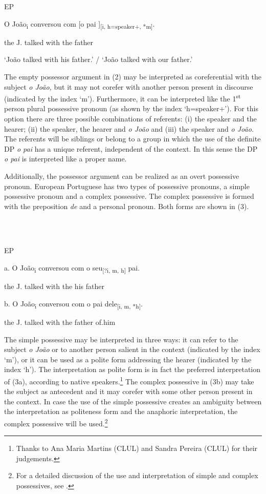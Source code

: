 \documentclass[output=paper]{langsci/langscibook}
\begin{document}
          EP

O  João\textsubscript{i}   conversou     com [o   pai ]\textsubscript{[i, h=speaker+, *m]}.

the J.     talked   with the father

‘João talked with his father.’ / ‘João talked with our father.’

The empty possessor argument in (2) may be interpreted as coreferential with the subject \textit{o João,} but it may not corefer with another person present in discourse (indicated by the index ‘m’). Furthermore, it can be interpreted like the 1\textsuperscript{st} person plural possessive pronoun (as shown by the index ‘h=speaker+’). For this option there are three possible combinations of referents: (i) the speaker and the hearer; (ii) the speaker, the hearer and \textit{o João} and (iii) the speaker and \textit{o João.} The referents will be siblings or belong to a group in which the use of the definite DP \textit{o pai} has a unique referent, independent of the context. In this sense the DP \textit{o pai} is interpreted like a proper name.

Additionally, the possessor argument can be realized as an overt possessive pronoun. European Portuguese has two types of possessive pronouns, a simple possessive pronoun and a complex possessive. The complex possessive is formed with the preposition \textit{de} and a personal pronoun. Both forms are shown in (3).

\ea%
    \label{ex:key:3}
    \gll\\
        \\
    \glt
    \z

          EP

a.  O João\textsubscript{i} conversou com o seu\textsubscript{[?i, m, h]} pai.  

the J. talked with the his father

b.  O João\textsubscript{i} conversou com o   pai   dele\textsubscript{[i, m, *h]}.

the J. talked with the father of.him

The simple possessive may be interpreted in three ways: it can refer to the subject \textit{o João} or to another person salient in the context (indicated by the index ‘m’), or it can be used as a polite form addressing the hearer (indicated by the index ‘h’). The interpretation as polite form is in fact the preferred interpretation of (3a), according to native speakers.\footnote{Thanks to Ana Maria Martins (CLUL) and Sandra Pereira (CLUL) for their judgements.} The complex possessive in (3b) may take the subject as antecedent and it may corefer with some other person present in the context. In case the use of the simple possessive creates an ambiguity between the interpretation as politeness form and the anaphoric interpretation, the complex possessive will be used.\footnote{For a detailed discussion of the use and interpretation of simple and complex possessives, see \citet{Castro2005}.}
\end{document}
